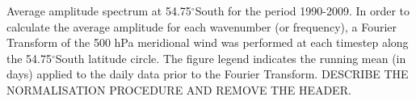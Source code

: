 \label{fig:fourier_spectrum}
Average amplitude spectrum at 54.75$^{\circ}$South for the period 1990-2009. In order to calculate the average amplitude for each wavenumber (or frequency), a Fourier Transform of the 500 hPa meridional wind was performed at each timestep along the 54.75$^{\circ}$South latitude circle. The figure legend indicates the running mean (in days) applied to the daily data prior to the Fourier Transform. DESCRIBE THE NORMALISATION PROCEDURE AND REMOVE THE HEADER.  